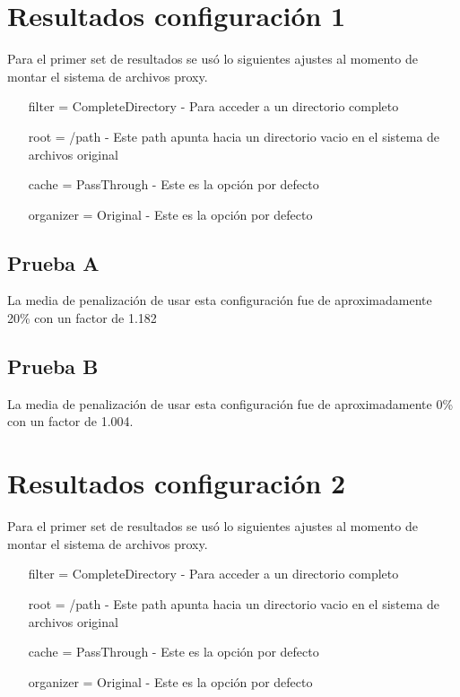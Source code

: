 \section{Resultados configuración 1}

Para el primer set de resultados se usó lo siguientes ajustes al momento de montar el sistema de archivos proxy.

\begin{itemize}
\item[filter] = CompleteDirectory - Para acceder a un directorio completo
\item[root] = /path - Este path apunta hacia un directorio vacio en el sistema de archivos original
\item[cache] = PassThrough - Este es la opción por defecto
\item[organizer] = Original - Este es la opción por defecto
\end{itemize}

\subsection{Prueba A}

La media de penalización de usar esta configuración fue de aproximadamente 20\% con un factor de 1.182


\subsection{Prueba B}

La media de penalización de usar esta configuración fue de aproximadamente 0\% con un factor de 1.004.



\section{Resultados configuración 2}

Para el primer set de resultados se usó lo siguientes ajustes al momento de montar el sistema de archivos proxy.

\begin{itemize}
\item[filter] = CompleteDirectory - Para acceder a un directorio completo
\item[root] = /path - Este path apunta hacia un directorio vacio en el sistema de archivos original
\item[cache] = PassThrough - Este es la opción por defecto
\item[organizer] = Original - Este es la opción por defecto
\end{itemize}

